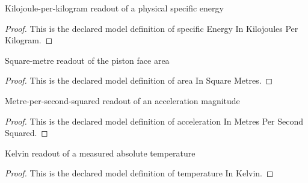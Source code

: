 \begin{definition}
  \label{def:physics:phyx-mini-0454:phyxminiproblems-problemphyxmini0454-specificenergyinkilojoulesperkilogram}
  Kilojoule-per-kilogram readout of a physical specific energy
\end{definition}
\begin{proof}
  This is the declared model definition of specific Energy In Kilojoules Per Kilogram.
\end{proof}
\begin{definition}
  \label{def:physics:phyx-mini-0454:phyxminiproblems-problemphyxmini0454-areainsquaremetres}
  Square-metre readout of the piston face area
\end{definition}
\begin{proof}
  This is the declared model definition of area In Square Metres.
\end{proof}
\begin{definition}
  \label{def:physics:phyx-mini-0454:phyxminiproblems-problemphyxmini0454-accelerationinmetrespersecondsquared}
  Metre-per-second-squared readout of an acceleration magnitude
\end{definition}
\begin{proof}
  This is the declared model definition of acceleration In Metres Per Second Squared.
\end{proof}
\begin{definition}
  \label{def:physics:phyx-mini-0454:phyxminiproblems-problemphyxmini0454-temperatureinkelvin}
  Kelvin readout of a measured absolute temperature
\end{definition}
\begin{proof}
  This is the declared model definition of temperature In Kelvin.
\end{proof}
